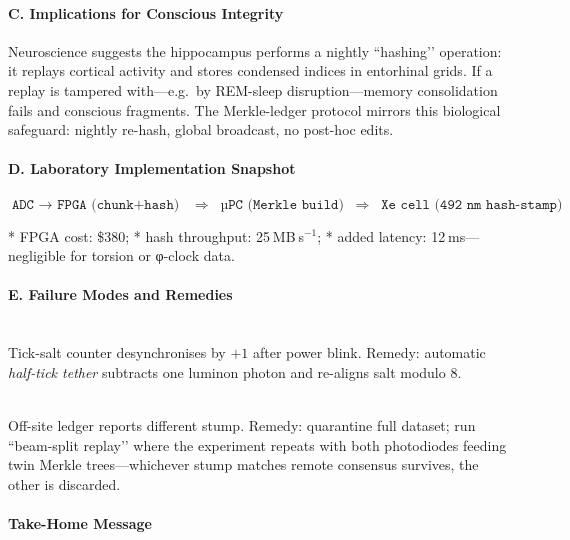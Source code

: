 \documentclass[11pt,oneside]{book}
\begin{document}
{\paragraph{C. Implications for Conscious Integrity}

Neuroscience suggests the hippocampus performs a nightly “hashing’’
operation: it replays cortical activity and stores condensed indices in
entorhinal grids.  
If a replay is tampered with—e.g.\ by REM-sleep disruption—memory
consolidation fails and conscious fragments.  
The Merkle-ledger protocol mirrors this biological safeguard: nightly
re-hash, global broadcast, no post-hoc edits.

\paragraph{D. Laboratory Implementation Snapshot}

\[
\texttt{ADC $\to$ FPGA (chunk+hash)} \;\;\Longrightarrow\;\;
\texttt{µPC (Merkle build)} \;\;\Longrightarrow\;\;
\texttt{Xe cell (492 nm hash‐stamp)}
\]

* FPGA cost: \$380;  
* hash throughput: 25 MB s\(^{-1}\);  
* added latency: 12 ms—negligible for torsion or φ-clock data.

\paragraph{E. Failure Modes and Remedies}

\begin{description}[leftmargin=1.8cm, style=nextline]
\item[Hash drift] \hfill\\
      Tick-salt counter desynchronises by $+1$ after power blink.  
      Remedy: automatic \emph{half-tick tether} subtracts one luminon
      photon and re-aligns salt modulo 8.
\item[Root mismatch] \hfill\\
      Off-site ledger reports different stump.  
      Remedy: quarantine full dataset; run “beam-split replay’’
      where the experiment repeats with both photodiodes feeding twin
      Merkle trees—whichever stump matches remote consensus survives,
      the other is discarded.
\end{description}

\paragraph{Take-Home Message}

}
\end{document}

